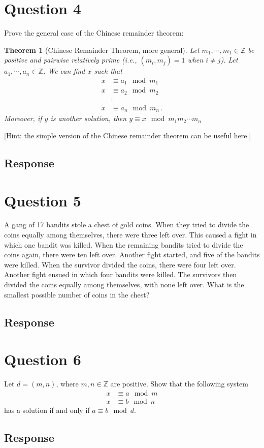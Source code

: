 \documentclass [12pt] {article}
\newtheorem{theorem}{Theorem}
\newcommand{\Z}{\mathbb{Z}}
\begin{document}
\section*{Question 4}
Prove the general case of the Chinese remainder theorem: 

\begin{theorem}[Chinese Remainder Theorem, more general]
    Let $m_1,\cdots,m_1\in\Z$ be positive and pairwise relatively prime (i.e., $(m_i,m_j)=1$ when $i\neq j$). Let $a_1,\cdots,a_n\in \Z$. We can find $x$ such that 
    \begin{align*}
        x &\equiv a_1\mod m_1 \\
        x &\equiv a_2\mod m_2 \\
        &\vdots \\
        x &\equiv a_n\mod m_n\,.
    \end{align*}
    Moreover, if $y$ is another solution, then $y\equiv x\mod m_1m_2\cdots m_n$
\end{theorem}
[Hint: the simple version of the Chinese remainder theorem can be useful here.]

\subsection*{Response}
\newpage

\section*{Question 5}
 A gang of 17 bandits stole a chest of gold coins.
When they tried to divide the coins equally among themselves, there were three left over. This caused a fight in which one bandit was killed. When the remaining bandits tried to divide the coins again, there were ten left over.
Another fight started, and five of the bandits were killed. When the survivor divided the coins, there were four left over. Another fight ensued in which four bandits were killed. The survivors then divided the coins equally among themselves, with none left over. What is the smallest possible number of coins in the chest? 

\subsection*{Response}
\newpage

\section*{Question 6}
Let $d=(m,n)$, where $m,n\in\Z$ are positive. Show that the following system 
\begin{align*}
    x& \equiv a\mod m \\
    x& \equiv b\mod n
\end{align*}
has a solution if and only if $a\equiv b\mod d$.

\subsection*{Response}
\newpage
\end{document}
